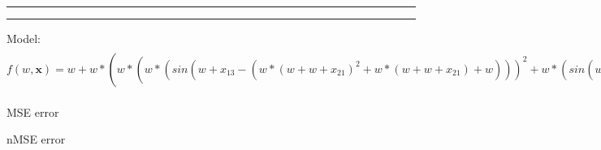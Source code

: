 \documentclass[12pt]{article}
\begin{document}
\hrule
\vspace{1cm}
\hrule
\vspace{1cm}
Model: $f(w,\mathbf{x})=w+w*(w*(w*(sin(w+x_13-(w*(w+w+x_21)^2+w*(w+w+x_21)+w)))^2+w*(sin(w+x_13-(w*(w+w+x_21)^2+w*(w+w+x_21)+w)))+w)^2+w*(w*(sin(w+x_13-(w*(w+w+x_21)^2+w*(w+w+x_21)+w)))^2+w*(sin(w+x_13-(w*(w+w+x_21)^2+w*(w+w+x_21)+w)))+w)+w)^2+w*(w*(w*(sin(w+x_13-(w*(w+w+x_21)^2+w*(w+w+x_21)+w)))^2+w*(sin(w+x_13-(w*(w+w+x_21)^2+w*(w+w+x_21)+w)))+w)^2+w*(w*(sin(w+x_13-(w*(w+w+x_21)^2+w*(w+w+x_21)+w)))^2+w*(sin(w+x_13-(w*(w+w+x_21)^2+w*(w+w+x_21)+w)))+w)+w)+w-(w*(w+w+x_21)^2+w*(w+w+x_21)+w)-(w+w*(x_41-(w*(x_42)^2+w*(x_42)+w-(w*(x_1-(w*(x_42)^2+w*(x_42)+w-(w*(x_1-(w*(w*(sin(w+w+x_21))^2+w*(sin(w+w+x_21))+w)^2+w*(w*(sin(w+w+x_21))^2+w*(sin(w+w+x_21))+w)+w))^2+w*(x_1-(w*(w*(sin(w+w+x_21))^2+w*(sin(w+w+x_21))+w)^2+w*(w*(sin(w+w+x_21))^2+w*(sin(w+w+x_21))+w)+w))+w)))^2+w*(x_1-(w*(x_42)^2+w*(x_42)+w-(w*(x_1-(w*(w*(sin(w+w+x_21))^2+w*(sin(w+w+x_21))+w)^2+w*(w*(sin(w+w+x_21))^2+w*(sin(w+w+x_21))+w)+w))^2+w*(x_1-(w*(w*(sin(w+w+x_21))^2+w*(sin(w+w+x_21))+w)^2+w*(w*(sin(w+w+x_21))^2+w*(sin(w+w+x_21))+w)+w))+w)))+w)))^2+w*(x_41-(w*(x_42)^2+w*(x_42)+w-(w*(x_1-(w*(x_42)^2+w*(x_42)+w-(w*(x_1-(w*(w*(sin(w+w+x_21))^2+w*(sin(w+w+x_21))+w)^2+w*(w*(sin(w+w+x_21))^2+w*(sin(w+w+x_21))+w)+w))^2+w*(x_1-(w*(w*(sin(w+w+x_21))^2+w*(sin(w+w+x_21))+w)^2+w*(w*(sin(w+w+x_21))^2+w*(sin(w+w+x_21))+w)+w))+w)))^2+w*(x_1-(w*(x_42)^2+w*(x_42)+w-(w*(x_1-(w*(w*(sin(w+w+x_21))^2+w*(sin(w+w+x_21))+w)^2+w*(w*(sin(w+w+x_21))^2+w*(sin(w+w+x_21))+w)+w))^2+w*(x_1-(w*(w*(sin(w+w+x_21))^2+w*(sin(w+w+x_21))+w)^2+w*(w*(sin(w+w+x_21))^2+w*(sin(w+w+x_21))+w)+w))+w)))+w)))+w)$

MSE error

nMSE error
\end{document}
